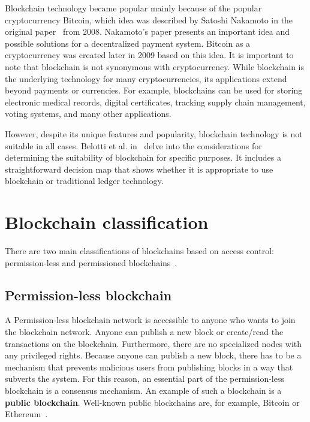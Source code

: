 Blockchain technology became popular mainly because of the popular cryptocurrency Bitcoin, which idea was described by Satoshi Nakamoto in the original paper~\cite{nakamoto2009bitcoin} from 2008. Nakamoto's paper presents an important idea and possible solutions for a decentralized payment system. Bitcoin as a cryptocurrency was created later in 2009 based on this idea. It is important to note that blockchain is not synonymous with cryptocurrency. While blockchain is the underlying technology for many cryptocurrencies, its applications extend beyond payments or currencies. For example, blockchains can be used for storing electronic medical records, digital certificates, tracking supply chain management, voting systems, and many other applications. 

However, despite its unique features and popularity, blockchain technology is not suitable in all cases. Belotti et al. in~\cite{vademecun.blockchain} delve into the considerations for determining the suitability of blockchain for specific purposes. It includes a straightforward decision map that shows whether it is appropriate to use blockchain or traditional ledger technology.


\section{Blockchain classification}
\label{Blockchain classification}

There are two main classifications of blockchains based on access control: permission-less and permissioned blockchains~\cite{comprehensive.survey.blockchain}.

\subsection{Permission-less blockchain}

A Permission-less blockchain network is accessible to anyone who wants to join the blockchain network. Anyone can publish a new block or create/read the transactions on the blockchain. Furthermore, there are no specialized nodes with any privileged rights. Because anyone can publish a new block, there has to be a mechanism that prevents malicious users from publishing blocks in a way that subverts the system. For this reason, an essential part of the permission-less blockchain is a consensus mechanism. An example of such a blockchain is a \textbf{public blockchain}. Well-known public blockchains are, for example, Bitcoin or Ethereum~\cite{bc.technology.overview}.

